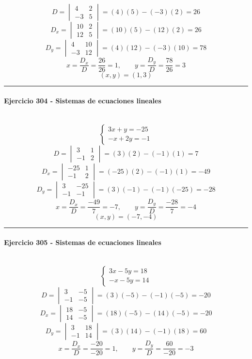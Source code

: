 \documentclass[10pt,a4paper]{article}
\newcommand{\res}[1]{\paragraph{#1}\mbox{}\\[-1.2em]}
\begin{document}
\[ D=\begin{vmatrix}4&2\\-3&5\end{vmatrix}=(4)(5)-(-3)(2)=26 \]
\[ D_x=\begin{vmatrix}10&2\\12&5\end{vmatrix}=(10)(5)-(12)(2)=26 \]
\[ D_y=\begin{vmatrix}4&10\\-3&12\end{vmatrix}=(4)(12)-(-3)(10)=78 \]
\[ x=\frac{D_x}{D}=\frac{26}{26}=1,\qquad y=\frac{D_y}{D}=\frac{78}{26}=3 \]
\[ \boxed{(x,y)=(1,3)} \]
\vspace{1mm}\hrule\vspace{2mm}
\res{Ejercicio 304 - Sistemas de ecuaciones lineales}
\[ \begin{cases}3 x + y=-25\\- x + 2 y=-1\end{cases} \]
\[ D=\begin{vmatrix}3&1\\-1&2\end{vmatrix}=(3)(2)-(-1)(1)=7 \]
\[ D_x=\begin{vmatrix}-25&1\\-1&2\end{vmatrix}=(-25)(2)-(-1)(1)=-49 \]
\[ D_y=\begin{vmatrix}3&-25\\-1&-1\end{vmatrix}=(3)(-1)-(-1)(-25)=-28 \]
\[ x=\frac{D_x}{D}=\frac{-49}{7}=-7,\qquad y=\frac{D_y}{D}=\frac{-28}{7}=-4 \]
\[ \boxed{(x,y)=(-7,-4)} \]
\vspace{1mm}\hrule\vspace{2mm}
\res{Ejercicio 305 - Sistemas de ecuaciones lineales}
\[ \begin{cases}3 x - 5 y=18\\- x - 5 y=14\end{cases} \]
\[ D=\begin{vmatrix}3&-5\\-1&-5\end{vmatrix}=(3)(-5)-(-1)(-5)=-20 \]
\[ D_x=\begin{vmatrix}18&-5\\14&-5\end{vmatrix}=(18)(-5)-(14)(-5)=-20 \]
\[ D_y=\begin{vmatrix}3&18\\-1&14\end{vmatrix}=(3)(14)-(-1)(18)=60 \]
\[ x=\frac{D_x}{D}=\frac{-20}{-20}=1,\qquad y=\frac{D_y}{D}=\frac{60}{-20}=-3 \]
\end{document}
